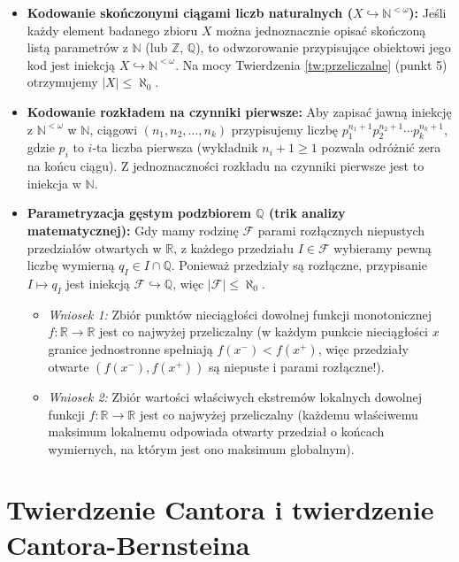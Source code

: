 \documentclass[11pt, a4paper]{article}
\theoremstyle{definition}
\theoremstyle{plain}
\theoremstyle{remark}
\begin{document}
\begin{itemize}
    \item \textbf{Kodowanie skończonymi ciągami liczb naturalnych ($X \hookrightarrow \mathbb{N}^{<\omega}$):} Jeśli każdy element badanego zbioru $X$ można jednoznacznie opisać skończoną listą parametrów z $\mathbb{N}$ (lub $\mathbb{Z}$, $\mathbb{Q}$), to odwzorowanie przypisujące obiektowi jego kod jest iniekcją $X \hookrightarrow \mathbb{N}^{<\omega}$. Na mocy Twierdzenia \ref{tw:przeliczalne} (punkt 5) otrzymujemy $|X| \le \aleph_0$.
    \item \textbf{Kodowanie rozkładem na czynniki pierwsze:} Aby zapisać jawną iniekcję z $\mathbb{N}^{<\omega}$ w $\mathbb{N}$, ciągowi $(n_1, n_2, \dots, n_k)$ przypisujemy liczbę $p_1^{n_1 + 1} p_2^{n_2 + 1} \cdots p_k^{n_k + 1}$, gdzie $p_i$ to $i$-ta liczba pierwsza (wykładnik $n_i + 1 \ge 1$ pozwala odróżnić zera na końcu ciągu). Z jednoznaczności rozkładu na czynniki pierwsze jest to iniekcja w $\mathbb{N}$.
    \item \textbf{Parametryzacja gęstym podzbiorem $\mathbb{Q}$ (trik analizy matematycznej):} Gdy mamy rodzinę $\mathcal{F}$ parami rozłącznych niepustych przedziałów otwartych w $\mathbb{R}$, z każdego przedziału $I \in \mathcal{F}$ wybieramy pewną liczbę wymierną $q_I \in I \cap \mathbb{Q}$. Ponieważ przedziały są rozłączne, przypisanie $I \mapsto q_I$ jest iniekcją $\mathcal{F} \hookrightarrow \mathbb{Q}$, więc $|\mathcal{F}| \le \aleph_0$.
    \begin{itemize}
        \item \emph{Wniosek 1:} Zbiór punktów nieciągłości dowolnej funkcji monotonicznej $f : \mathbb{R} \to \mathbb{R}$ jest co najwyżej przeliczalny (w każdym punkcie nieciągłości $x$ granice jednostronne spełniają $f(x^-) < f(x^+)$, więc przedziały otwarte $(f(x^-), f(x^+))$ są niepuste i parami rozłączne!).
        \item \emph{Wniosek 2:} Zbiór wartości właściwych ekstremów lokalnych dowolnej funkcji $f : \mathbb{R} \to \mathbb{R}$ jest co najwyżej przeliczalny (każdemu właściwemu maksimum lokalnemu odpowiada otwarty przedział o końcach wymiernych, na którym jest ono maksimum globalnym).
    \end{itemize}
\end{itemize}

\section{Twierdzenie Cantora i twierdzenie Cantora-Bernsteina}
\end{document}
